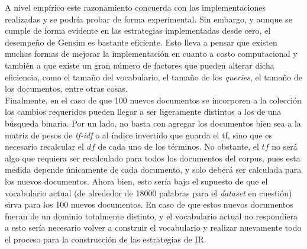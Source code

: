 A nivel empírico este razonamiento concuerda con las implementaciones realizadas y se podría probar de forma experimental. Sin embargo, y aunque se cumple de forma evidente en las estrategias implementadas desde cero, el desempeño de Gensim es bastante eficiente. Esto lleva a pensar que existen muchas formas de mejorar la implementación en cuanto a costo computacional y también a que existe un gran número de factores que pueden alterar dicha eficiencia, como el tamaño del vocabulario, el tamaño de los \textit{queries}, el tamaño de los documentos, entre otras cosas. \\

Finalmente, en el caso de que 100 nuevos documentos se incorporen a la colección los cambios requeridos pueden llegar a ser ligeramente distintos a los de una búsqueda binaria. Por un lado, no basta con agregar los documentos bien sea a la matriz de pesos de \textit{tf-idf} o al índice invertido que guarda el tf, sino que es necesario recalcular el $df$ de cada uno de los términos. No obstante, el $tf$ no será algo que requiera ser recalculado para todos los documentos del corpus, pues esta medida depende únicamente de cada documento, y solo deberá ser calculada para los nuevos documentos. Ahora bien, esto sería bajo el supuesto de que el vocabulario actual (de alrededor de 18000 palabras para el \textit{dataset} en cuestión) sirva para los 100 nuevos documentos. En caso de que estos nuevos documentos fueran de un dominio totalmente distinto, y el vocabulario actual no respondiera a esto sería necesario volver a construir el vocabulario y realizar nuevamente todo el proceso para la construcción de las estrategias de IR.
